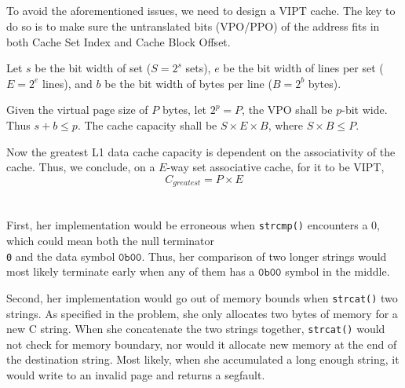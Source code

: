 \documentclass[12pt]{article}
\begin{document}
\subsection{}

To avoid the aforementioned issues, we need to design a VIPT cache. The key to do so is to make sure the untranslated bits (VPO/PPO) of the address fits in both Cache Set Index and Cache Block Offset. 

Let $s$ be the bit width of set ($S = 2^s$ sets), $e$ be the bit width of lines per set ($E = 2^e$ lines), and $b$ be the bit width of bytes per line ($B = 2^b$ bytes).

Given the virtual page size of $P$ bytes, let $2^p = P$, the VPO shall be $p$-bit wide. Thus $s + b \leq p$. The cache capacity shall be $S \times E \times B$, where $S \times B \leq P$.

Now the greatest L1 data cache capacity is dependent on the associativity of the cache. Thus, we conclude, on a $E$-way set associative cache, for it to be VIPT,
$$ C_{greatest} = P \times E$$

\newpage
\section{}

\subsection{}
First, her implementation would be erroneous when \texttt{strcmp()} encounters a 0, which could mean both the null terminator \texttt{\\0} and the data symbol $\mathtt{0b00}$. Thus, her comparison of two longer strings would most likely terminate early when any of them has a $\mathtt{0b00}$ symbol in the middle.

Second, her implementation would go out of memory bounds when \texttt{strcat()} two strings. As specified in the problem, she only allocates two bytes of memory for a new C string. When she concatenate the two strings together, \texttt{strcat()} would not check for memory boundary, nor would it allocate new memory at the end of the destination string. Most likely, when she accumulated a long enough string, it would write to an invalid page and returns a segfault.

\subsection{}
\end{document}
